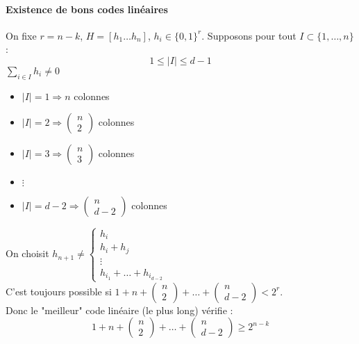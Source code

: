 \documentclass[12pt,a4paper]{report}
\begin{document}
\paragraph{Existence de bons codes linéaires\\}
On fixe $r=n-k$, $H=[h_1 \ldots h_n]$, $h_i \in \{0,1\}^r $. Supposons pour tout $I \subset \{1,\ldots,n\}$ :
$$ 1 \leqslant |I| \leqslant d-1 $$
$\displaystyle \sum_{i\in I}h_i \neq 0 $
\begin{itemize}
\item $|I|=1 \Rightarrow n$ colonnes
\item $|I|=2 \Rightarrow \left(\begin{array}{c} n \\ 2 \end{array}\right)$ colonnes
\item $|I|=3 \Rightarrow \left(\begin{array}{c} n \\ 3 \end{array}\right)$ colonnes
\item $\vdots $
\item $|I|=d-2 \Rightarrow \left(\begin{array}{c} n \\ d-2 \end{array}\right)$ colonnes
\end{itemize}
On choisit $h_{n+1} \neq \left\{\begin{array}{c}
h_i \\
h_i+h_j \\
\vdots \\
h_{i_1} + \ldots + h_{i_{d-2}} \end{array}\right. $\\
C'est toujours possible si $1+n+\left(\begin{array}{c} n \\ 2 \end{array}\right)+ \ldots + \left(\begin{array}{c} n \\ d-2 \end{array}\right) < 2^r $.\\
Donc le "meilleur" code linéaire (le plus long) vérifie :
$$ 1+n+\left(\begin{array}{c} n \\ 2 \end{array}\right)+ \ldots + \left(\begin{array}{c} n \\ d-2 \end{array}\right) \geqslant 2^{n-k} $$
\end{document}
